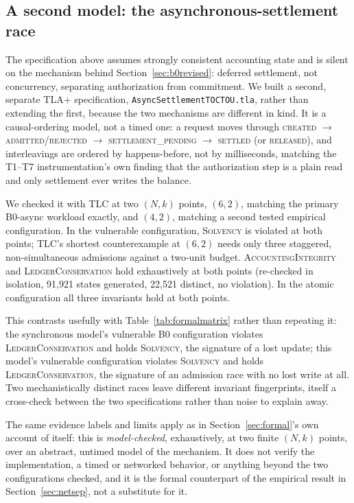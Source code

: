 \documentclass[final,5p,times,twocolumn,number]{elsarticle}
\begin{document}
\subsection{A second model: the asynchronous-settlement race}
\label{sec:asyncformal}
The specification above assumes strongly consistent accounting state and is silent on
the mechanism behind Section~\ref{sec:b0revised}: deferred settlement, not concurrency,
separating authorization from commitment. We built a second, separate TLA+
specification, \texttt{AsyncSettlementTOCTOU.tla}, rather than extending the first,
because the two mechanisms are different in kind. It is a causal-ordering model, not a
timed one: a request moves through \textsc{created}
$\to$ \textsc{admitted}/\textsc{rejected} $\to$ \textsc{settlement\_pending} $\to$
\textsc{settled} (or \textsc{released}), and interleavings are ordered by happens-before,
not by milliseconds, matching the T1--T7 instrumentation's own finding that the
authorization step is a plain read and only settlement ever writes the balance.

We checked it with TLC at two $(N,k)$ points, $(6,2)$, matching the primary B0-async
workload exactly, and $(4,2)$, matching a second tested empirical configuration. In the
vulnerable configuration, \textsc{Solvency} is violated at both points; TLC's shortest
counterexample at $(6,2)$ needs only three staggered, non-simultaneous admissions against
a two-unit budget. \textsc{AccountingIntegrity} and \textsc{LedgerConservation} hold
exhaustively at both points (re-checked in isolation, 91{,}921 states generated, 22{,}521
distinct, no violation). In the atomic configuration all three invariants hold at both
points.

This contrasts usefully with Table~\ref{tab:formalmatrix} rather than repeating it: the
synchronous model's vulnerable B0 configuration violates \textsc{LedgerConservation} and
holds \textsc{Solvency}, the signature of a lost update; this model's vulnerable
configuration violates \textsc{Solvency} and holds \textsc{LedgerConservation}, the
signature of an admission race with no lost write at all. Two mechanistically distinct
races leave different invariant fingerprints, itself a cross-check between the two
specifications rather than noise to explain away.

The same evidence labels and limits apply as in Section~\ref{sec:formal}'s own account of
itself: this is \emph{model-checked}, exhaustively, at two finite $(N,k)$ points, over an
abstract, untimed model of the mechanism. It does not verify the implementation, a timed
or networked behavior, or anything beyond the two configurations checked, and it is the
formal counterpart of the empirical result in Section~\ref{sec:netsep}, not a substitute
for it.
\end{document}
